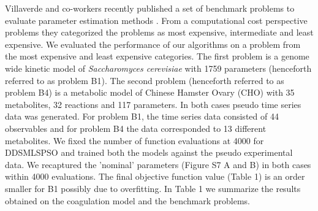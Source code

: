 \documentclass[12pt]{article}
\begin{document}
Villaverde and co-workers recently published a set of benchmark problems to evaluate parameter estimation methods \cite{villaverde2015biopredyn}. From a computational cost perspective problems they categorized the problems as most expensive, intermediate and least expensive. We evaluated the performance of our algorithms on a problem from the most expensive and least expensive categories. The first problem is a genome wide kinetic model of \textit{Saccharomyces cerevisiae} with 1759 parameters (henceforth referred to as problem B1).  The second problem (henceforth referred to as problem B4) is a metabolic model of Chinese Hamster Ovary (CHO) with 35 metabolites, 32 reactions and 117 parameters. In both cases pseudo time series data was generated. For problem B1, the time series data consisted of 44 observables and for problem B4 the data corresponded to 13 different metabolites. We fixed the number of function evaluations at 4000 for DDSMLSPSO and trained both the models against the pseudo experimental data. We recaptured the 'nominal' parameters (Figure S7 A and B)  in both cases within 4000 evaluations. The final objective function value (Table 1) is an order smaller for B1 possibly due to overfitting. In Table 1 we summarize the results obtained on the coagulation model and the benchmark problems.


\begin{table}[h]
\centering
\caption{Table with optimization settings and results for coagulation and different benchmarks using DDSMLSPSO.}
\label{table:1}
\end{table}
\end{document}
